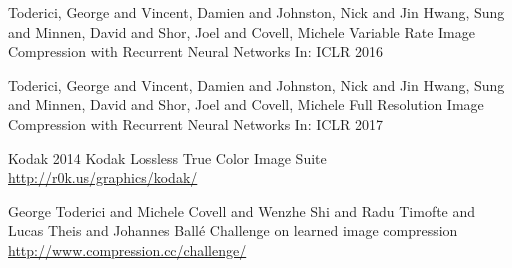 \documentclass{beamer}
\begin{document}
\begin{frame}[allowframebreaks]
{\begin{thebibliography}{99}
 Toderici, George and Vincent, Damien and Johnston, Nick and Jin Hwang, Sung and Minnen, David and Shor, Joel and Covell, Michele
\newblock Variable Rate Image Compression with Recurrent Neural Networks
\newblock In: ICLR 2016

 Toderici, George and Vincent, Damien and Johnston, Nick and Jin Hwang, Sung and Minnen, David and Shor, Joel and Covell, Michele
\newblock Full Resolution Image Compression with Recurrent Neural Networks
\newblock In: ICLR 2017

 Kodak 2014
\newblock Kodak {L}ossless {T}rue {C}olor {I}mage {S}uite
\newblock \url{http://r0k.us/graphics/kodak/}
    
 George Toderici and Michele Covell and Wenzhe Shi and Radu Timofte and Lucas Theis and Johannes Ballé
\newblock Challenge on learned image compression
\newblock \url{http://www.compression.cc/challenge/}

\end{thebibliography}
}
\end{frame}
\end{document}
